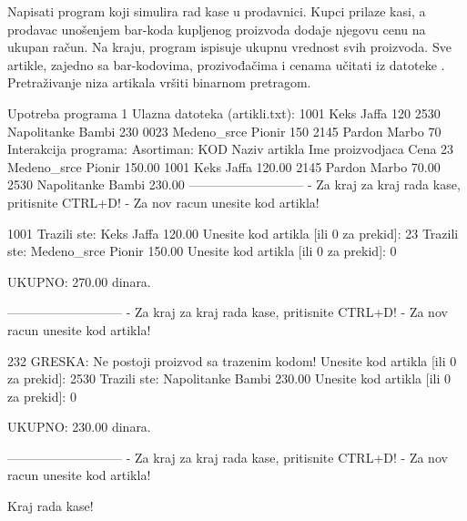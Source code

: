 \begin{Answer}[ref=511]
\end{Answer}
\begin{Exercise}[label=512]
  Napisati program koji simulira rad kase u prodavnici. Kupci prilaze
  kasi, a prodavac unošenjem bar-koda kupljenog proizvoda dodaje
  njegovu cenu na ukupan račun. Na kraju, program ispisuje ukupnu
  vrednost svih proizvoda. Sve artikle, zajedno sa bar-kodovima,
  prozivođačima i cenama učitati iz datoteke
  . Pretraživanje niza artikala vršiti binarnom
  pretragom.
  
\begin{maxitest}
\begin{test}{Upotreba programa 1}
Ulazna datoteka (artikli.txt):
  1001 Keks Jaffa 120
  2530 Napolitanke Bambi 230
  0023 Medeno_srce Pionir 150
  2145 Pardon Marbo 70
Interakcija programa:
  Asortiman:
  KOD                Naziv artikla     Ime proizvodjaca       Cena
          23          Medeno_srce               Pionir       150.00
        1001                 Keks                Jaffa       120.00
        2145               Pardon                Marbo        70.00
        2530          Napolitanke                Bambi       230.00
  ---------------------------
  - Za kraj za kraj rada kase, pritisnite CTRL+D!
  - Za nov racun unesite kod artikla!
  
  1001
  	Trazili ste:	Keks Jaffa       120.00
  Unesite kod artikla [ili 0 za prekid]: 	23
  	Trazili ste:	Medeno_srce Pionir       150.00
  Unesite kod artikla [ili 0 za prekid]: 	0
  
  	UKUPNO: 270.00 dinara.
  
  ---------------------------
  - Za kraj za kraj rada kase, pritisnite CTRL+D!
  - Za nov racun unesite kod artikla!
  
  232
  	GRESKA: Ne postoji proizvod sa trazenim kodom!
  Unesite kod artikla [ili 0 za prekid]: 	2530
  	Trazili ste:	Napolitanke Bambi       230.00
  Unesite kod artikla [ili 0 za prekid]: 	0
  
  	UKUPNO: 230.00 dinara.
  
  ---------------------------
  - Za kraj za kraj rada kase, pritisnite CTRL+D!
  - Za nov racun unesite kod artikla!
  
  Kraj rada kase!  
\end{test}
\end{maxitest}
  
\end{Exercise}

